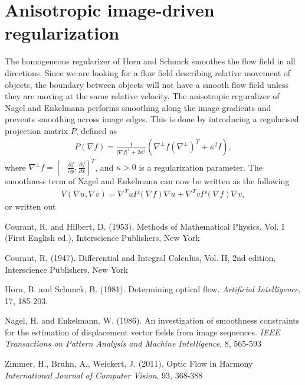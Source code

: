 \documentclass[10pt,a4paper]{article}
\begin{document}
\section{Anisotropic image-driven regularization}
The homogeneous regularizer of Horn and Schunck smoothes the flow field in all directions. Since we are looking for a flow field describing relative movement of objects, the boundary between objects will not have a smooth flow field unless they are moving at the same relative velocity. The anisotropic reguralizer of Nagel and Enkelmann \cite{NE} performs smoothing along the image gradients and prevents smoothing across image edges. This is done by introducing a regularised projection matrix $P$, defined as
\begin{align*}
P(\nabla f) = \frac{1}{|\nabla f|^2 + 2 \kappa^2} (\nabla^{\bot} f (\nabla^{\bot})^T + \kappa^2 I),
\end{align*}
where $\nabla^{\bot} f= \left[-\frac{\partial f}{\partial y}, \frac{\partial f}{\partial x}\right]^T$, and $\kappa > 0$ is a regularization parameter. The smoothness term of Nagel and Enkelmann can now be written as the following
\begin{align*}
V(\nabla u, \nabla v) = \nabla ^T u P(\nabla f) \nabla u + \nabla ^T v P(\nabla f) \nabla v,
\end{align*}
or written out 

\begin{thebibliography}{}

Courant, R. and Hilbert, D. (1953). Methods of Mathematical Physics. Vol. I (First English ed.), Interscience Publishers, New York

Courant, R. (1947). Differential and Integral Calculus, Vol. II, 2nd edition, Interscience Publishers, New York


Horn, B. and Schunck, B. (1981). Determining optical flow. \emph{Artificial Intelligence}, 17, 185-203.

Nagel, H. and Enkelmann, W. (1986). An investigation of smoothness constraints for the estimation of displacement vector fields from image sequences. \emph{IEEE Transactions on Pattern Analysis and Machine Intelligence}, 8, 565-593

Zimmer, H., Bruhn, A., Weickert, J. (2011). Optic Flow in Harmony \emph{International Journal of Computer Vision}, 93, 368-388


\end{thebibliography}
\end{document}
